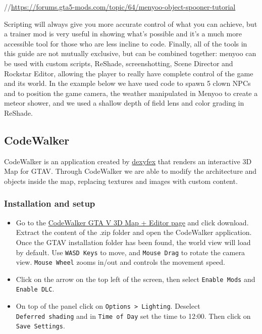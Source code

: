 \documentclass[
  openany]{book}
\begin{document}
//\url{https://forums.gta5-mods.com/topic/64/menyoo-object-spooner-tutorial}

Scripting will always give you more accurate control of what you can achieve, but a trainer mod is very useful in showing what's possible and it's a much more accessible tool for those who are less incline to code. Finally, all of the tools in this guide are not mutually exclusive, but can be combined together: menyoo can be used with custom scripts, ReShade, screenshotting, Scene Director and Rockstar Editor, allowing the player to really have complete control of the game and its world. In the example below we have used code to spawn 5 clown NPCs and to position the game camera, the weather manipulated in Menyoo to create a meteor shower, and we used a shallow depth of field lens and color grading in ReShade.

\hypertarget{codewalker}{%
\subsection*{CodeWalker}\label{codewalker}}

CodeWalker is an application created by \href{https://github.com/dexyfex/CodeWalker}{dexyfex} that renders an interactive 3D Map for GTAV. Through CodeWalker we are able to modify the architecture and objects inside the map, replacing textures and images with custom content.

\hypertarget{installation-and-setup-1}{%
\subsubsection*{Installation and setup}\label{installation-and-setup-1}}

\begin{itemize}
\item
  Go to the \href{https://www.gta5-mods.com/tools/codewalker-gtav-interactive-3d-map}{CodeWalker GTA V 3D Map + Editor page} and click download. Extract the content of the .zip folder and open the CodeWalker application. Once the GTAV installation folder has been found, the world view will load by default. Use \texttt{WASD\ Keys} to move, and \texttt{Mouse\ Drag} to rotate the camera view. \texttt{Mouse\ Wheel} zooms in/out and controls the movement speed.
\item
  Click on the arrow on the top left of the screen, then select \texttt{Enable\ Mods} and \texttt{Enable\ DLC}.
\item
  On top of the panel click on \texttt{Options\ \textgreater{}\ Lighting}. Deselect \texttt{Deferred\ shading} and in \texttt{Time\ of\ Day} set the time to 12:00. Then click on \texttt{Save\ Settings}.
\end{itemize}
\end{document}
